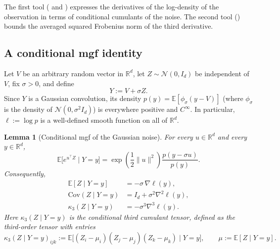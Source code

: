 \documentclass[11pt]{article}
\def\E{\mathbb{E}}
\def\R{\mathbb{R}}
\newcommand{\norm}[1]{\|#1\|}
\newcommand{\Cov}{\mathrm{Cov}}
\newtheorem{lemma}{Lemma}
\begin{document}
The first tool ( and ) expresses the derivatives of the log-density of the observation in terms of conditional cumulants of the noise. The second tool () bounds the averaged squared Frobenius norm of the third derivative.

\subsection{A conditional mgf identity}

Let \(V\) be an arbitrary random vector in \(\R^d\), let \(Z\sim\mathcal N(0,I_d)\) be independent of \(V\), fix \(\sigma>0\), and define
\[
Y := V + \sigma Z.
\]
Since \(Y\) is a Gaussian convolution, its density \(p(y)=\E[\phi_\sigma(y-V)]\) (where \(\phi_\sigma\) is the density of \(\mathcal N(0,\sigma^2 I_d)\)) is everywhere positive and \(C^\infty\). In particular, \(\ell:=\log p\) is a well-defined smooth function on all of \(\R^d\).

\begin{lemma}[Conditional mgf of the Gaussian noise]
\label{lem:conditional_mgf_Z}
For every \(u\in\R^d\) and every \(y\in\R^d\),
\begin{equation}
\label{eq:conditional_mgf_Z}
\E\big[e^{u^\top Z}\mid Y=y\big]
=
\exp\!\left(\frac12\norm{u}^2\right)
\frac{p(y-\sigma u)}{p(y)}.
\end{equation}
Consequently,
\begin{align}
\label{eq:Ez_given_Y}
\E[Z\mid Y=y]
&= -\sigma\,\nabla \ell(y), \\
\label{eq:CovZ_given_Y}
\Cov(Z\mid Y=y)
&= I_d + \sigma^2\nabla^2 \ell(y), \\
\label{eq:kappa3_Z_given_Y}
\kappa_3(Z\mid Y=y)
&= -\sigma^3\nabla^3 \ell(y).
\end{align}
Here \(\kappa_3(Z\mid Y=y)\) is the conditional third cumulant tensor, defined as the third-order tensor with entries
\[
\kappa_3(Z\mid Y=y)_{ijk}
:=
\E\big[(Z_i-\mu_i)(Z_j-\mu_j)(Z_k-\mu_k)\mid Y=y\big],
\qquad
\mu:=\E[Z\mid Y=y].
\]
\end{lemma}
\end{document}
